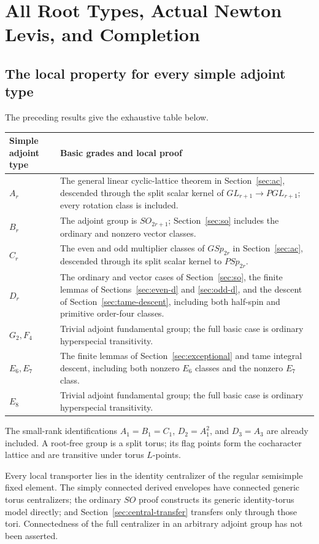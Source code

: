 \documentclass[11pt,a4paper]{article}
\theoremstyle{definition}
\theoremstyle{remark}
\begin{document}
\section{All Root Types, Actual Newton Levis, and Completion}
\label{sec:completion}

\subsection{The local property for every simple adjoint type}
The preceding results give the exhaustive table below.
\begin{longtable}{@{}p{.17\linewidth}p{.77\linewidth}@{}}
\toprule
Simple adjoint type&Basic grades and local proof\\
\midrule
\endhead
\(A_r\)&The general linear cyclic-lattice theorem in
Section~\ref{sec:ac}, descended through the split scalar kernel of
\(GL_{r+1}\to PGL_{r+1}\); every rotation class is included.\\
\(B_r\)&The adjoint group is \(SO_{2r+1}\);
Section~\ref{sec:so} includes the ordinary and nonzero vector classes.\\
\(C_r\)&The even and odd multiplier classes of \(GSp_{2r}\) in
Section~\ref{sec:ac}, descended through its split scalar kernel
to \(PSp_{2r}\).\\
\(D_r\)&The ordinary and vector cases of Section~\ref{sec:so},
the finite lemmas of Sections~\ref{sec:even-d} and \ref{sec:odd-d},
and the descent of Section~\ref{sec:tame-descent}, including both
half-spin and primitive order-four classes.\\
\(G_2,F_4\)&Trivial adjoint fundamental group; the full basic
case is ordinary hyperspecial transitivity.\\
\(E_6,E_7\)&The finite lemmas of Section~\ref{sec:exceptional}
and tame integral descent, including both nonzero \(E_6\) classes
and the nonzero \(E_7\) class.\\
\(E_8\)&Trivial adjoint fundamental group; the full basic
case is ordinary hyperspecial transitivity.\\
\bottomrule
\end{longtable}
The small-rank identifications \(A_1=B_1=C_1\), \(D_2=A_1^2\),
and \(D_3=A_3\) are already included. A root-free group is a split
torus; its flag points form the cocharacter lattice and are
transitive under torus \(L\)-points.

Every local transporter lies in the identity centralizer of the
regular semisimple fixed element. The simply connected derived
envelopes have connected generic torus centralizers; the ordinary
\(SO\) proof constructs its generic identity-torus model directly;
and Section~\ref{sec:central-transfer} transfers only through those
tori. Connectedness of the full centralizer in an arbitrary adjoint
group has not been asserted.
\end{document}
